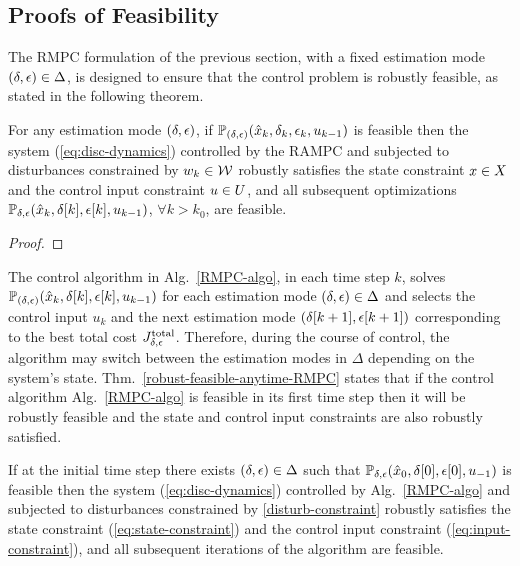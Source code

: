 \subsection{Proofs of Feasibility}
The RMPC formulation of the previous section, with a fixed estimation mode
$\left(\delta,\epsilon\right)\in\Delta$, is designed to ensure that the control problem is robustly feasible, as stated in the following theorem.
\begin{thm}
\label{thm:robust-feasible-RMPC} For
any estimation mode $\left(\delta,\epsilon\right)$, if $\mathbb{P}_{(\delta,\epsilon)}(\hat{x}_{k},\delta_{k},\epsilon_{k},u_{k -1})$
is feasible then the system (\ref{eq:disc-dynamics}) controlled by
the RAMPC and subjected to disturbances constrained by $w_k \in \mathcal{W}$
robustly satisfies the state constraint $x \in X$
and the control input constraint $u \in U$, and
all subsequent optimizations $\mathbb{P_{\delta,\epsilon}}(\hat{x}_{k},\delta[k],\epsilon[k],u_{k-1})$,
$\forall k>k_{0}$, are feasible.
\end{thm}
\begin{proof}

\end{proof}
The control algorithm in Alg.~\ref{RMPC-algo}, in each time step $k$, solves $\mathbb{P_{(\delta,\epsilon)}}(\hat{x}_{k},\delta[k],\epsilon[k],u_{k-1})$ for each estimation mode $\left(\delta,\epsilon\right)\in\Delta$ and selects the control input $u_{k}$ and the next estimation mode $\left(\delta[k+1],\epsilon[k+1]\right)$
corresponding to the best total cost $J_{\delta,\epsilon}^{\mathrm{total}}$.
Therefore, during the course of control, the algorithm may switch between the estimation modes in $\Delta$ depending on the system's state. Thm.~\ref{robust-feasible-anytime-RMPC} states that if the control algorithm Alg.~\ref{RMPC-algo} is feasible in its first time step then it will be robustly feasible and the state and control input constraints are also robustly satisfied.
\begin{thm}%
\label{thm:robust-feasible-anytime-RMPC}
If at the initial time step there exists $\left(\delta,\epsilon\right)\in\Delta$
such that $\mathbb{P_{\delta,\epsilon}}(\hat{x}_{0},\delta[0],\epsilon[0],u_{-1})$
is feasible then the system (\ref{eq:disc-dynamics}) controlled by
Alg.~\ref{RMPC-algo} and subjected to disturbances constrained
by \eqref{disturb-constraint} robustly satisfies the state constraint
(\ref{eq:state-constraint}) and the control input constraint (\ref{eq:input-constraint}),
and all subsequent iterations of the algorithm are feasible.
\end{thm}
